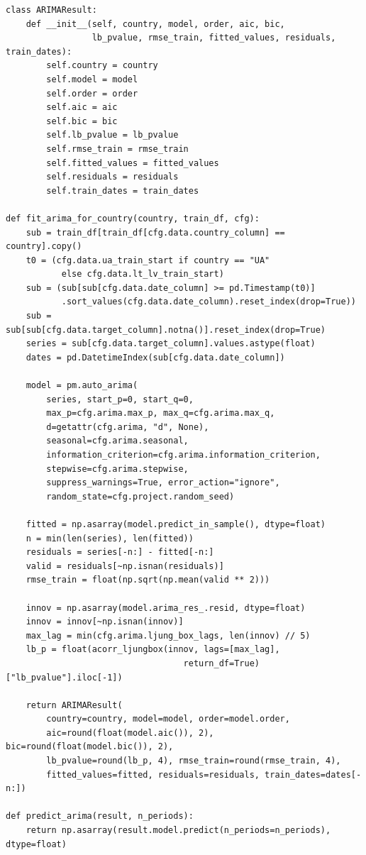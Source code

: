 \documentclass{bachelor_thesis}
\begin{document}
\begin{lstlisting}[caption={Підбір порядку ARIMA, діагностика залишків та виклик}]
class ARIMAResult:
    def __init__(self, country, model, order, aic, bic,
                 lb_pvalue, rmse_train, fitted_values, residuals, train_dates):
        self.country = country
        self.model = model
        self.order = order
        self.aic = aic
        self.bic = bic
        self.lb_pvalue = lb_pvalue
        self.rmse_train = rmse_train
        self.fitted_values = fitted_values
        self.residuals = residuals
        self.train_dates = train_dates

def fit_arima_for_country(country, train_df, cfg):
    sub = train_df[train_df[cfg.data.country_column] == country].copy()
    t0 = (cfg.data.ua_train_start if country == "UA"
           else cfg.data.lt_lv_train_start)
    sub = (sub[sub[cfg.data.date_column] >= pd.Timestamp(t0)]
           .sort_values(cfg.data.date_column).reset_index(drop=True))
    sub = sub[sub[cfg.data.target_column].notna()].reset_index(drop=True)
    series = sub[cfg.data.target_column].values.astype(float)
    dates = pd.DatetimeIndex(sub[cfg.data.date_column])

    model = pm.auto_arima(
        series, start_p=0, start_q=0,
        max_p=cfg.arima.max_p, max_q=cfg.arima.max_q,
        d=getattr(cfg.arima, "d", None),
        seasonal=cfg.arima.seasonal,
        information_criterion=cfg.arima.information_criterion,
        stepwise=cfg.arima.stepwise,
        suppress_warnings=True, error_action="ignore",
        random_state=cfg.project.random_seed)

    fitted = np.asarray(model.predict_in_sample(), dtype=float)
    n = min(len(series), len(fitted))
    residuals = series[-n:] - fitted[-n:]
    valid = residuals[~np.isnan(residuals)]
    rmse_train = float(np.sqrt(np.mean(valid ** 2)))

    innov = np.asarray(model.arima_res_.resid, dtype=float)
    innov = innov[~np.isnan(innov)]
    max_lag = min(cfg.arima.ljung_box_lags, len(innov) // 5)
    lb_p = float(acorr_ljungbox(innov, lags=[max_lag],
                                   return_df=True)["lb_pvalue"].iloc[-1])

    return ARIMAResult(
        country=country, model=model, order=model.order,
        aic=round(float(model.aic()), 2), bic=round(float(model.bic()), 2),
        lb_pvalue=round(lb_p, 4), rmse_train=round(rmse_train, 4),
        fitted_values=fitted, residuals=residuals, train_dates=dates[-n:])

def predict_arima(result, n_periods):
    return np.asarray(result.model.predict(n_periods=n_periods), dtype=float)
\end{lstlisting}
\end{document}

